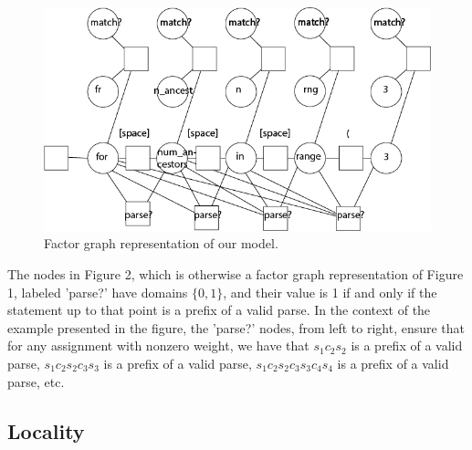 \documentclass[10pt]{article}
\begin{document}
\begin{figure}[h]
  \centering
    \includegraphics[scale=0.3]{improvedFactorGraph.png}
  \caption{Factor graph representation of our model.}
\label{fig:sparselog}
\end{figure}

The nodes in Figure 2, which is otherwise a factor graph representation of Figure 1, labeled 'parse?' have domains $\{0,1\}$, and their value is 1 if and only if the statement up to that point is a prefix of a valid parse. In the context of the example presented in the figure, the 'parse?' nodes, from left to right, ensure that for any assignment with nonzero weight, we have that $s_1 c_2 s_2$ is a prefix of a valid parse,   $s_1 c_2 s_2 c_3 s_3$ is a prefix of a valid parse, $s_1 c_2 s_2  c_3 s_3 c_4 s_4$ is a prefix of a valid parse, etc. 

\subsection{Locality}
\end{document}
